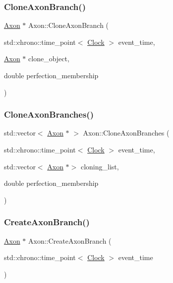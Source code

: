 \subsubsection{\texorpdfstring{Clone\+Axon\+Branch()}{CloneAxonBranch()}}
{\footnotesize\ttfamily \mbox{\hyperlink{classAxon}{Axon}} $\ast$ Axon\+::\+Clone\+Axon\+Branch (\begin{DoxyParamCaption}\item[{std\+::chrono\+::time\+\_\+point$<$ \mbox{\hyperlink{universe_8h_a0ef8d951d1ca5ab3cfaf7ab4c7a6fd80}{Clock}} $>$}]{event\+\_\+time,  }\item[{\mbox{\hyperlink{classAxon}{Axon}} $\ast$}]{clone\+\_\+object,  }\item[{double}]{perfection\+\_\+membership }\end{DoxyParamCaption})}

\mbox{\label{classAxon_af2d6d5bc9ee0cd8ff654a949ef1cc294}} 
\subsubsection{\texorpdfstring{Clone\+Axon\+Branches()}{CloneAxonBranches()}}
{\footnotesize\ttfamily std\+::vector$<$ \mbox{\hyperlink{classAxon}{Axon}} $\ast$ $>$ Axon\+::\+Clone\+Axon\+Branches (\begin{DoxyParamCaption}\item[{std\+::chrono\+::time\+\_\+point$<$ \mbox{\hyperlink{universe_8h_a0ef8d951d1ca5ab3cfaf7ab4c7a6fd80}{Clock}} $>$}]{event\+\_\+time,  }\item[{std\+::vector$<$ \mbox{\hyperlink{classAxon}{Axon}} $\ast$$>$}]{cloning\+\_\+list,  }\item[{double}]{perfection\+\_\+membership }\end{DoxyParamCaption})}

\mbox{\label{classAxon_a41e97ead4c793003db2de87061574c26}} 
\subsubsection{\texorpdfstring{Create\+Axon\+Branch()}{CreateAxonBranch()}}
{\footnotesize\ttfamily \mbox{\hyperlink{classAxon}{Axon}} $\ast$ Axon\+::\+Create\+Axon\+Branch (\begin{DoxyParamCaption}\item[{std\+::chrono\+::time\+\_\+point$<$ \mbox{\hyperlink{universe_8h_a0ef8d951d1ca5ab3cfaf7ab4c7a6fd80}{Clock}} $>$}]{event\+\_\+time }\end{DoxyParamCaption})}

